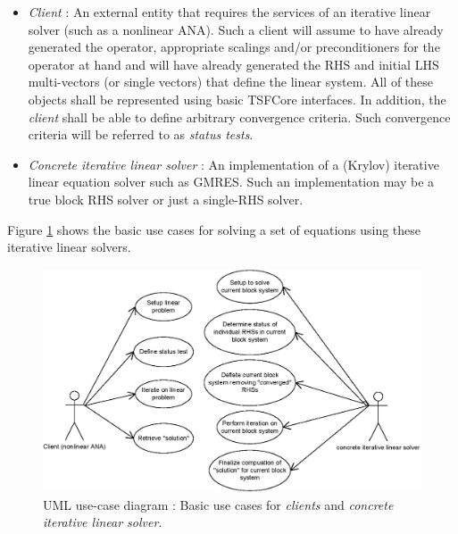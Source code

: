 \documentclass[pdf,ps2pdf,11pt]{SANDreport}
\begin{document}
\begin{itemize}

\item{}\textit{Client} :
An external entity that requires the services of an iterative linear
solver (such as a nonlinear ANA).  Such a client will assume to have
already generated the operator, appropriate scalings and/or
preconditioners for the operator at hand and will have already
generated the RHS and initial LHS multi-vectors (or single vectors)
that define the linear system.  All of these objects shall be
represented using basic TSFCore interfaces.  In addition, the
{}\textit{client} shall be able to define arbitrary convergence
criteria.  Such convergence criteria will be referred to as
{}\textit{status tests}.

\item{}\textit{Concrete iterative linear solver} : 
An implementation of a (Krylov) iterative linear equation solver such
as GMRES.  Such an implementation may be a true block RHS solver or
just a single-RHS solver.

\end{itemize}

Figure {}\ref{belos:fig:BelosUseCases} shows the basic use cases for
solving a set of equations using these iterative linear solvers.

{\bsinglespace
\begin{figure}[t]
\begin{center}
\includegraphics*[scale=0.85]{BelosUseCases}
\end{center}
\caption{
\label{belos:fig:BelosUseCases}
UML use-case diagram : Basic use cases
for {}\textit{clients} and {}\textit{concrete iterative linear solver}.}
\end{figure}
\esinglespace}
\end{document}
